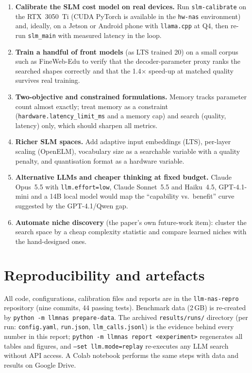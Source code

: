\documentclass[11pt,a4paper]{article}
\newcommand{\code}[1]{\texttt{#1}}
\begin{document}
\begin{enumerate}
  \item \textbf{Calibrate the SLM cost model on real devices.} Run \code{slm-calibrate} on the RTX~3050~Ti (CUDA PyTorch is available in the \code{hw-nas} environment) and, ideally, on a Jetson or Android phone with \code{llama.cpp} at Q4, then re-run \code{slm\_main} with measured latency in the loop.
  \item \textbf{Train a handful of front models} (as LTS trained 20) on a small corpus such as FineWeb-Edu to verify that the decoder-parameter proxy ranks the searched shapes correctly and that the 1.4$\times$ speed-up at matched quality survives real training.
  \item \textbf{Two-objective and constrained formulations.} Memory tracks parameter count almost exactly; treat memory as a constraint (\code{hardware.latency\_limit\_ms} and a memory cap) and search (quality, latency) only, which should sharpen all metrics.
  \item \textbf{Richer SLM spaces.} Add adaptive input embeddings (LTS), per-layer scaling (OpenELM), vocabulary size as a searchable variable with a quality penalty, and quantisation format as a hardware variable.
  \item \textbf{Alternative LLMs and cheaper thinking at fixed budget.} Claude Opus~5.5 with \code{llm.effort=low}, Claude Sonnet~5.5 and Haiku~4.5, GPT-4.1-mini and a 14B local model would map the ``capability vs.\ benefit'' curve suggested by the GPT-4.1/Qwen gap.
  \item \textbf{Automate niche discovery} (the paper's own future-work item): cluster the search space by a cheap complexity statistic and compare learned niches with the hand-designed ones.
\end{enumerate}

\section{Reproducibility and artefacts}
All code, configurations, calibration files and reports are in the \code{llm-nas-repro} repository (nine commits, 44 passing tests). Benchmark data (2\,GB) is re-created by \code{python -m llmnas prepare-data}. The archived \code{results/runs/} directory (per run: \code{config.yaml}, \code{run.json}, \code{llm\_calls.jsonl}) is the evidence behind every number in this report; \code{python -m llmnas report <experiment>} regenerates all tables and figures, and \code{--set llm.mode=replay} re-executes any LLM search without API access. A Colab notebook performs the same steps with data and results on Google Drive.
\end{document}
